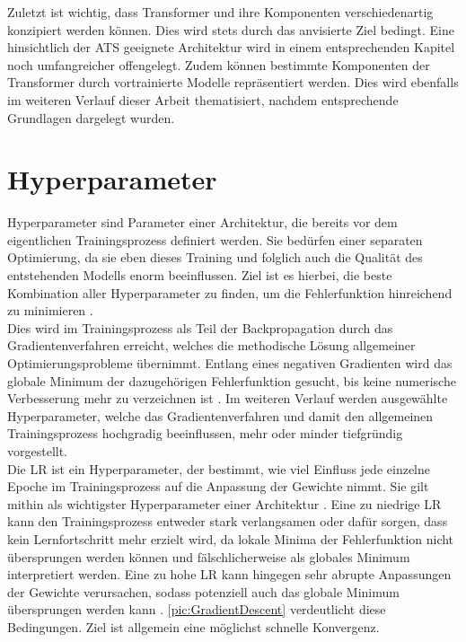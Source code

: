 \noindent
Zuletzt ist wichtig, dass Transformer und ihre Komponenten verschiedenartig konzipiert werden können. Dies wird stets durch das anvisierte Ziel bedingt. Eine hinsichtlich der \ac{ATS} geeignete Architektur wird in einem entsprechenden Kapitel noch umfangreicher offengelegt. Zudem können bestimmte Komponenten der Transformer durch vortrainierte Modelle repräsentiert werden. Dies wird ebenfalls im weiteren Verlauf dieser Arbeit thematisiert, nachdem entsprechende Grundlagen dargelegt wurden.
\newpage


\section{Hyperparameter}
\noindent
Hyperparameter sind Parameter einer Architektur, die bereits vor dem eigentlichen Trainingsprozess definiert werden. Sie bedürfen einer separaten Optimierung, da sie eben dieses Training und folglich auch die Qualität des entstehenden Modells enorm beeinflussen. Ziel ist es hierbei, die beste Kombination aller Hyperparameter zu finden, um die Fehlerfunktion hinreichend zu minimieren \cite[S.~1]{YAN20}.\\

\noindent
Dies wird im Trainingsprozess als Teil der Backpropagation durch das Gradientenverfahren erreicht, welches die methodische Lösung allgemeiner Optimierungsprobleme übernimmt. Entlang eines negativen Gradienten wird das globale Minimum der dazugehörigen Fehlerfunktion gesucht, bis keine numerische Verbesserung mehr zu verzeichnen ist \cite[S.~428]{ZHA20}. Im weiteren Verlauf werden ausgewählte Hyperparameter, welche das Gradientenverfahren und damit den allgemeinen Trainingsprozess hochgradig beeinflussen, mehr oder minder tiefgründig vorgestellt.\\

\noindent
Die \ac{LR} ist ein Hyperparameter, der bestimmt, wie viel Einfluss jede einzelne Epoche im Trainingsprozess auf die Anpassung der Gewichte nimmt. Sie gilt mithin als wichtigster Hyperparameter einer Architektur \cite[S.~428]{ZHA20}. Eine zu niedrige \ac{LR} kann den Trainingsprozess entweder stark verlangsamen oder dafür sorgen, dass kein Lernfortschritt mehr erzielt wird, da lokale Minima der Fehlerfunktion nicht übersprungen werden können und fälschlicherweise als globales Minimum interpretiert werden. Eine zu hohe \ac{LR} kann hingegen sehr abrupte Anpassungen der Gewichte verursachen, sodass potenziell auch das globale Minimum übersprungen werden kann \cite[S.~414-415]{ZHA20}. \autoref{pic:GradientDescent} verdeutlicht diese Bedingungen. Ziel ist allgemein eine möglichst schnelle Konvergenz.\\

